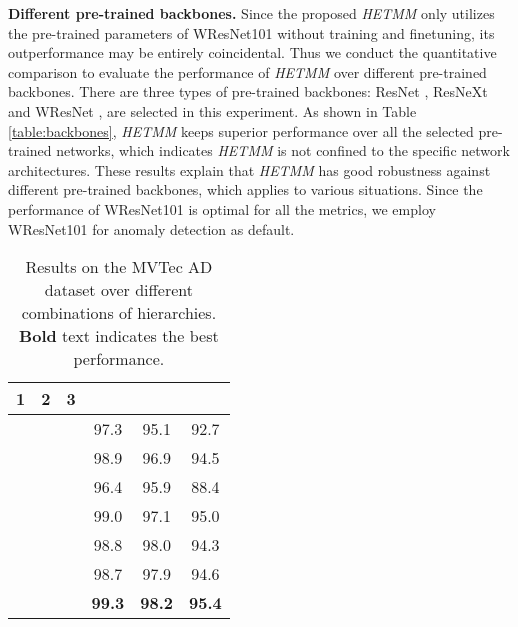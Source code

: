 \documentclass[default,iicol]{sn-jnl}\usepackage[algo2e,ruled,linesnumbered]{algorithm2e}
\theoremstyle{thmstyleone}\newtheorem{theorem}{Theorem}\newtheorem{proposition}[theorem]{Proposition}
\theoremstyle{thmstyletwo}\newtheorem{example}{Example}\newtheorem{remark}{Remark}
\theoremstyle{thmstylethree}\newtheorem{definition}{Definition}
\begin{document}
\noindent\textbf{Different pre-trained backbones. }
Since the proposed \textit{HETMM} only utilizes the pre-trained parameters of WResNet101 \cite{wresnet} without training and finetuning, its outperformance may be entirely coincidental.
Thus we conduct the quantitative comparison to evaluate the performance of \textit{HETMM} over different pre-trained backbones.
There are three types of pre-trained backbones: ResNet \cite{resnet}, ResNeXt \cite{resnext} and WResNet \cite{wresnet}, are selected in this experiment.
As shown in Table \ref{table:backbones}, \textit{HETMM} keeps superior performance over all the selected pre-trained networks, which indicates \textit{HETMM} is not confined to the specific network architectures.
These results explain that \textit{HETMM} has good robustness against different pre-trained backbones, which applies to various situations.
Since the performance of WResNet101 is optimal for all the metrics, we employ WResNet101 for anomaly detection as default.

\begin{table}[!t]
    \caption{
        Results on the MVTec AD dataset over different combinations of hierarchies. \textbf{Bold} text indicates the best performance.
    }
    \centering
    \label{table:hierarchies}
    \begin{tabular}{ccc|ccc}
    \hline
    1            & 2            & 3            &  &  &  \\\hline
     &              &              & 97.3              & 95.1              & 92.7     \\
                 &  &              & 98.9              & 96.9              & 94.5    \\
                 &              &  & 96.4              & 95.9              & 88.4    \\
     &  &              & 99.0              & 97.1              & 95.0    \\
                 &  &  & 98.8              & 98.0              & 94.3   \\
     &              &  & 98.7              & 97.9              & 94.6   \\
     &  &  & \textbf{99.3}     & \textbf{98.2}     & \textbf{95.4}   \\\hline
    \end{tabular}
\end{table}
\end{document}
